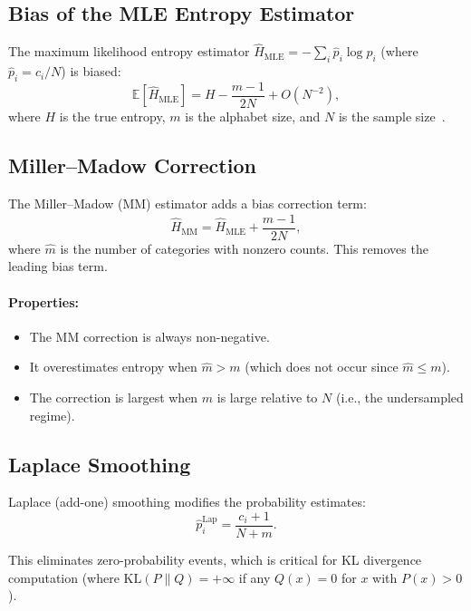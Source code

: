 \documentclass[11pt,a4paper]{article}
\newcommand{\E}{\mathbb{E}}
\newcommand{\KL}{\mathrm{KL}}
\begin{document}
\subsection{Bias of the MLE Entropy Estimator}

The maximum likelihood entropy estimator
$\hat{H}_{\mathrm{MLE}} = -\sum_i \hat{p}_i \log \hat{p}_i$
(where $\hat{p}_i = c_i / N$) is biased:
\begin{equation}
  \E[\hat{H}_{\mathrm{MLE}}] = H - \frac{m-1}{2N} + O(N^{-2}),
\end{equation}
where $H$ is the true entropy, $m$ is the alphabet size,
and $N$ is the sample size~\citep{miller1955note}.

\subsection{Miller--Madow Correction}

The Miller--Madow (MM) estimator adds a bias correction
term:
\begin{equation}
  \hat{H}_{\mathrm{MM}} = \hat{H}_{\mathrm{MLE}} + \frac{\hat{m}-1}{2N},
\end{equation}
where $\hat{m}$ is the number of categories with nonzero
counts.  This removes the leading bias term.

\paragraph{Properties:}
\begin{itemize}[leftmargin=2em,itemsep=2pt]
\item The MM correction is always non-negative.
\item It overestimates entropy when $\hat{m} > m$
      (which does not occur since $\hat{m} \leq m$).
\item The correction is largest when $m$ is large
      relative to $N$ (i.e., the undersampled regime).
\end{itemize}

\subsection{Laplace Smoothing}

Laplace (add-one) smoothing modifies the probability
estimates:
\begin{equation}
  \hat{p}_i^{\mathrm{Lap}} = \frac{c_i + 1}{N + m}.
\end{equation}

This eliminates zero-probability events, which is critical
for KL divergence computation (where $\KL(P \| Q) = +\infty$
if any $Q(x) = 0$ for $x$ with $P(x) > 0$).
\end{document}
